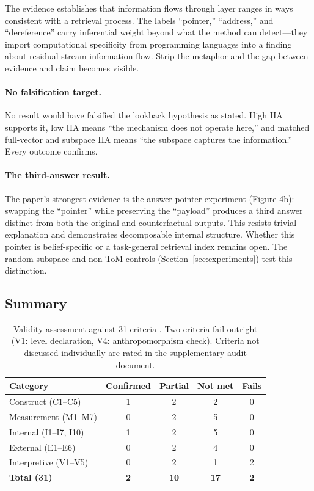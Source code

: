 \documentclass[11pt]{article}
\begin{document}
The evidence establishes that information flows through layer ranges in ways consistent with a retrieval process. The labels ``pointer,'' ``address,'' and ``dereference'' carry inferential weight beyond what the method can detect---they import computational specificity from programming languages into a finding about residual stream information flow. Strip the metaphor and the gap between evidence and claim becomes visible.

\paragraph{No falsification target.}
No result would have falsified the lookback hypothesis as stated. High IIA supports it, low IIA means ``the mechanism does not operate here,'' and matched full-vector and subspace IIA means ``the subspace captures the information.'' Every outcome confirms.

\paragraph{The third-answer result.}
The paper's strongest evidence is the answer pointer experiment (Figure 4b): swapping the ``pointer'' while preserving the ``payload'' produces a third answer distinct from both the original and counterfactual outputs. This resists trivial explanation and demonstrates decomposable internal structure. Whether this pointer is belief-specific or a task-general retrieval index remains open. The random subspace and non-ToM controls (Section~\ref{sec:experiments}) test this distinction.

\subsection{Summary}

\begin{table}[t]
\centering
\caption{Validity assessment against 31 criteria \citep{tower2026mechval}. Two criteria fail outright (V1: level declaration, V4: anthropomorphism check). Criteria not discussed individually are rated in the supplementary audit document.}
\label{tab:validity}
\begin{tabular}{lcccc}
\toprule
Category & Confirmed & Partial & Not met & Fails \\
\midrule
Construct (C1--C5) & 1 & 2 & 2 & 0 \\
Measurement (M1--M7) & 0 & 2 & 5 & 0 \\
Internal (I1--I7, I10) & 1 & 2 & 5 & 0 \\
External (E1--E6) & 0 & 2 & 4 & 0 \\
Interpretive (V1--V5) & 0 & 2 & 1 & 2 \\
\midrule
\textbf{Total (31)} & \textbf{2} & \textbf{10} & \textbf{17} & \textbf{2} \\
\bottomrule
\end{tabular}
\end{table}
\end{document}
